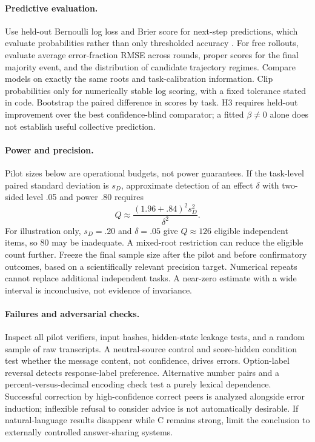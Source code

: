 \documentclass[11pt]{article}
\begin{document}
\paragraph{Predictive evaluation.}
Use held-out Bernoulli log loss and Brier score for next-step predictions, which evaluate probabilities rather than only thresholded accuracy \citep{gneiting2007proper}. For free rollouts, evaluate average error-fraction RMSE across rounds, proper scores for the final majority event, and the distribution of candidate trajectory regimes. Compare models on exactly the same roots and task-calibration information. Clip probabilities only for numerically stable log scoring, with a fixed tolerance stated in code. Bootstrap the paired difference in scores by task. H3 requires held-out improvement over the best confidence-blind comparator; a fitted $\beta\ne0$ alone does not establish useful collective prediction.

\paragraph{Power and precision.}
Pilot sizes below are operational budgets, not power guarantees. If the task-level paired standard deviation is $s_D$, approximate detection of an effect $\delta$ with two-sided level .05 and power .80 requires
\[
 Q\approx \frac{(1.96+.84)^2s_D^2}{\delta^2}.
\]
For illustration only, $s_D=.20$ and $\delta=.05$ give $Q\approx126$ eligible independent items, so 80 may be inadequate. A mixed-root restriction can reduce the eligible count further. Freeze the final sample size after the pilot and before confirmatory outcomes, based on a scientifically relevant precision target. Numerical repeats cannot replace additional independent tasks. A near-zero estimate with a wide interval is inconclusive, not evidence of invariance.

\paragraph{Failures and adversarial checks.}
Inspect all pilot verifiers, input hashes, hidden-state leakage tests, and a random sample of raw transcripts. A neutral-source control and score-hidden condition test whether the message content, not confidence, drives errors. Option-label reversal detects response-label preference. Alternative number pairs and a percent-versus-decimal encoding check test a purely lexical dependence. Successful correction by high-confidence correct peers is analyzed alongside error induction; inflexible refusal to consider advice is not automatically desirable. If natural-language results disappear while C remains strong, limit the conclusion to externally controlled answer-sharing systems.
\end{document}
